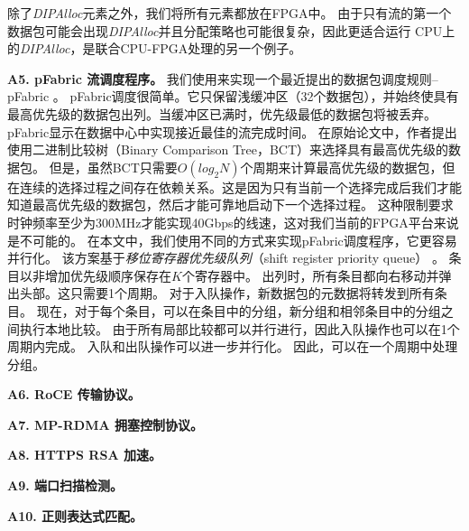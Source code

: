 除了\textit {DIPAlloc}元素之外，我们将所有元素都放在FPGA中。
由于只有流的第一个数据包可能会出现\textit {DIPAlloc}并且分配策略也可能很复杂，因此更适合运行
CPU上的\textit {DIPAlloc}，是联合CPU-FPGA处理的另一个例子。

%



\textbf {A5. pFabric 流调度程序。}
我们使用\name 来实现一个最近提出的数据包调度规则--pFabric \cite {pfabric}。
pFabric调度很简单。它只保留浅缓冲区（32个数据包），并始终使具有最高优先级的数据包出列。当缓冲区已满时，优先级最低的数据包将被丢弃。
pFabric显示在数据中心中实现接近最佳的流完成时间。
在原始论文中，作者提出使用二进制比较树（Binary Comparison Tree，BCT）来选择具有最高优先级的数据包。
但是，虽然BCT只需要$O(log_2 N)$个周期来计算最高优先级的数据包，但在连续的选择过程之间存在依赖关系。这是因为只有当前一个选择完成后我们才能知道最高优先级的数据包，然后才能可靠地启动下一个选择过程。
这种限制要求时钟频率至少为300MHz才能实现40Gbps的线速，这对我们当前的FPGA平台来说是不可能的。
在本文中，我们使用不同的方式来实现pFabric调度程序，它更容易并行化。
该方案基于\textit{移位寄存器优先级队列}（shift register priority queue） \cite {moon2000scalable}。
条目以非增加优先级顺序保存在$K$个寄存器中。
出列时，所有条目都向右移动并弹出头部。这只需要1个周期。
对于入队操作，新数据包的元数据将转发到所有条目。
现在，对于每个条目，可以在条目中的分组，新分组和相邻条目中的分组之间执行本地比较。
由于所有局部比较都可以并行进行，因此入队操作也可以在1个周期内完成。
入队和出队操作可以进一步并行化。
因此，可以在一个周期中处理分组。

\textbf{A6. RoCE 传输协议。}

\textbf{A7. MP-RDMA 拥塞控制协议。}

\textbf{A8. HTTPS RSA 加速。}

\textbf{A9. 端口扫描检测。}

\textbf{A10. 正则表达式匹配。}

